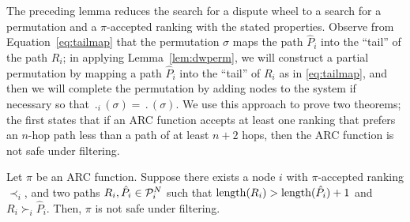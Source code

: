 The preceding lemma reduces the search for a dispute wheel to a search
for a permutation and a $\pi$-accepted ranking with the
stated properties.  Observe from Equation~\eqref{eq:tailmap} that the permutation
$\sigma$ maps the path $\hat{P}_i$ into the ``tail'' of the path $R_i$;
in applying Lemma~\ref{lem:dwperm}, we will construct a partial
permutation by mapping a path $\hat{P}_i$ into the ``tail'' of $R_i$ as
in \eqref{eq:tailmap}, and then we will complete the permutation by
adding nodes to the system if necessary so that $\period_i(\sigma) =
\period(\sigma)$.  We use this approach to prove two theorems; the first
states that if an ARC function accepts at least one ranking
that prefers an $n$-hop path less than a path of at least $n+2$ hops,
then the ARC function is not safe under filtering.

\begin{theorem}
\label{th:unsafe}
Let $\pi$ be an ARC function.  Suppose there exists a node $i$
with $\pi$-accepted ranking $\prec_i$, and two paths $R_i,
\hat{P}_i \in \P_i^N$ such that $\length(R_i) > \length(\hat{P}_i) + 1$
and $R_i \succ_i \hat{P}_i$.  Then, $\pi$ is not safe under filtering.
\end{theorem}



